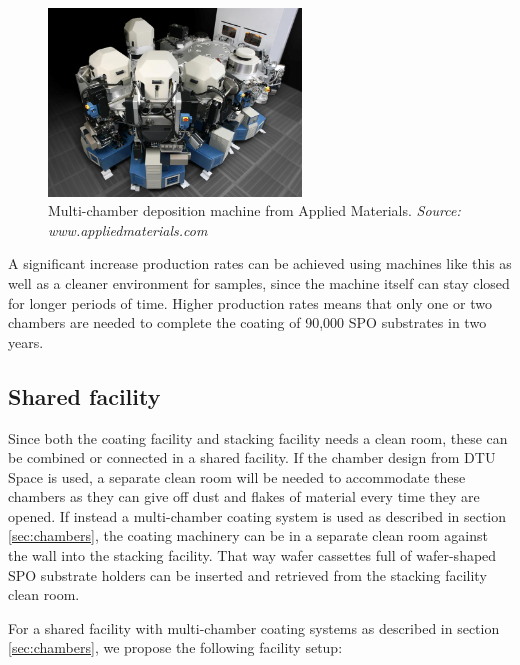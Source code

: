 \begin{figure}[htbp]
	\centering
		\includegraphics[width=0.6\textwidth]{figures/athena/dram.jpeg}
	\caption{Multi-chamber deposition machine from Applied Materials. \emph{Source: www.appliedmaterials.com}}
	\label{fig:dram}
\end{figure}

A significant increase production rates can be achieved using machines like this as well as a cleaner environment for samples, since the machine itself can stay closed for longer periods of time. Higher production rates means that only one or two chambers are needed to complete the coating of 90,000 SPO substrates in two years.

\subsection{Shared facility}
Since both the coating facility and stacking facility needs a clean room, these can be combined or connected in a shared facility. If the chamber design from DTU Space is used, a separate clean room will be needed to accommodate these chambers as they can give off dust and flakes of material every time they are opened. If instead a multi-chamber coating system is used as described in section \ref{sec:chambers}, the coating machinery can be in a separate clean room against the wall into the stacking facility. That way wafer cassettes full of wafer-shaped SPO substrate holders can be inserted and retrieved from the stacking facility clean room.

For a shared facility with multi-chamber coating systems as described in section \ref{sec:chambers}, we propose the following facility setup:

